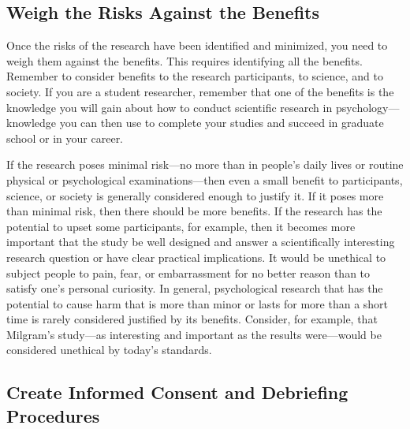\documentclass[
]{krantz}
\begin{document}
\subsection*{Weigh the Risks Against the Benefits}\label{weigh-the-risks-against-the-benefits}


Once the risks of the research have been identified and minimized, you need to weigh them against the benefits. This requires identifying all the benefits. Remember to consider benefits to the research participants, to science, and to society. If you are a student researcher, remember that one of the benefits is the knowledge you will gain about how to conduct scientific research in psychology---knowledge you can then use to complete your studies and succeed in graduate school or in your career.

If the research poses minimal risk---no more than in people's daily lives or routine physical or psychological examinations---then even a small benefit to participants, science, or society is generally considered enough to justify it. If it poses more than minimal risk, then there should be more benefits. If the research has the potential to upset some participants, for example, then it becomes more important that the study be well designed and answer a scientifically interesting research question or have clear practical implications. It would be unethical to subject people to pain, fear, or embarrassment for no better reason than to satisfy one's personal curiosity. In general, psychological research that has the potential to cause harm that is more than minor or lasts for more than a short time is rarely considered justified by its benefits. Consider, for example, that Milgram's study---as interesting and important as the results were---would be considered unethical by today's standards.

\subsection*{Create Informed Consent and Debriefing Procedures}\label{create-informed-consent-and-debriefing-procedures}
\end{document}
